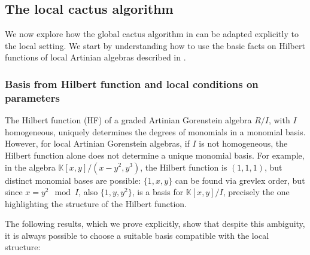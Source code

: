 \documentclass[a4paper,11p]{amsart}
\newcommand{\K}{\mathbb K}
\begin{document}
\subsection{The local cactus algorithm}\label{sec:GAD}


We now explore how the global cactus algorithm in \cite{Alessandra} can be adapted explicitly to the local setting. We start by understanding how to use the basic facts on Hilbert functions of local Artinian algebras described in \cite{Iarrobino}.




\subsubsection{Basis from Hilbert function and local conditions on parameters}

The Hilbert function (HF) of a graded Artinian Gorenstein algebra $R/I$, with $I$ homogeneous, uniquely determines the degrees of monomials in a monomial basis. However, for local Artinian Gorenstein algebras, if $I$ is not homogeneous, the Hilbert function alone does not determine a unique monomial basis. For example, in the algebra $\K[x,y]/(x-y^2,y^3)$, the Hilbert function is $(1,1,1)$, but distinct monomial bases  are possible: $\{1,x,y\}$  can be found via grevlex order, but since $x=y^2 \mod I$,  also $\{1,y,y^2\}$, is a basis for  $\K[x,y]/I$, precisely the one highlighting the structure of the Hilbert function.






The following results, which we prove explicitly, show that despite this ambiguity, it is always possible to choose a suitable basis compatible with the local structure:
\end{document}
